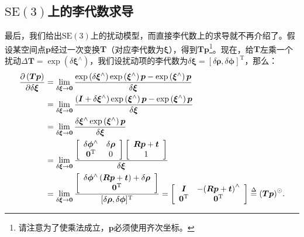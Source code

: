 \subsection{$\mathrm{SE}(3)$上的李代数求导}
\label{sec:se3-diff}
最后，我们给出$\mathrm{SE}(3)$上的扰动模型，而直接李代数上的求导就不再介绍了。假设某空间点$\bm{p}$经过一次变换$\bm{T}$（对应李代数为$\bm{\xi}$），得到$\bm{Tp}$\footnote{请注意为了使乘法成立，$\bm{p}$必须使用齐次坐标。}。现在，给$\bm{T}$左乘一个扰动$\Delta \bm{T} = \exp \left( \delta \bm{\xi}^\wedge  \right)$，我们设扰动项的李代数为$\delta \bm{\xi} = [\delta \bm{\rho}, \delta \bm{\phi}]^\mathrm{T}$，那么：
\begin{align*}
\frac{{\partial \left( \bm{Tp} \right)}}{{\partial \delta \bm{\xi}}} &= \mathop {\lim }\limits_{\delta \bm{\xi}  \to \bm{0}} \frac{{\exp \left( {\delta {\bm{\xi} ^ \wedge }} \right)\exp \left( {{\bm{\xi} ^ \wedge }} \right) \bm{p} - \exp \left( {{\bm{\xi} ^ \wedge }} \right) \bm{p} }}{{\delta \bm{\xi} }}\\
&= \mathop {\lim }\limits_{\delta \bm{\xi}  \to \bm{0}} \frac{{\left( { \bm{I} + \delta {\bm{\xi} ^ \wedge }} \right)\exp \left( {{\bm{\xi} ^ \wedge }} \right) \bm{p} - \exp \left( {{\bm{\xi} ^ \wedge }} \right) \bm{p} }}{{\delta {\bm{\xi} }}}\\
&= \mathop {\lim }\limits_{\delta \bm{\xi}  \to \bm{0}} \frac{{\delta {\bm{\xi} ^ \wedge }\exp \left( {{\bm{\xi} ^ \wedge }} \right) \bm{p}}}{{\delta {\bm{\xi} }}}\\
&= \mathop {\lim }\limits_{\delta \bm{\xi}  \to \bm{0}} 
\frac{{\left[ {\begin{array}{*{20}{c}}
			{\delta { \bm{\phi} ^ \wedge }}&{\delta {\bm{\rho} }}\\
			{{\bm{0}^\mathrm{T}}}&0
			\end{array}} \right]\left[ {\begin{array}{*{20}{c}}
			{\bm{Rp} + \bm{t}}\\
			1
			\end{array}} \right]}}{{\delta {\bm{\xi} }}}\\
&= \mathop {\lim }\limits_{\delta \bm{\xi}  \to \bm{0}} \frac{{\left[ {\begin{array}{*{20}{c}}
			{\delta {\bm{\phi} ^ \wedge }\left( {\bm{Rp} + \bm{t}} \right) + \delta {\bm{\rho} }}\\
			\bm{0}^\mathrm{T}
			\end{array}} \right]}}{[\delta\bm{\rho},\delta \bm{\phi}]^\mathrm{T}} = \left[ {\begin{array}{*{20}{c}}
	\bm{I} & { - {{\left( {\bm{Rp} + \bm{t}} \right)}^ \wedge }} \\
	{{\bm{0}}}^\mathrm{T} & \bm{0}^\mathrm{T}
	\end{array}} \right] \buildrel \Delta \over = {\left( \bm{Tp} \right)^ \odot }.
\end{align*}

